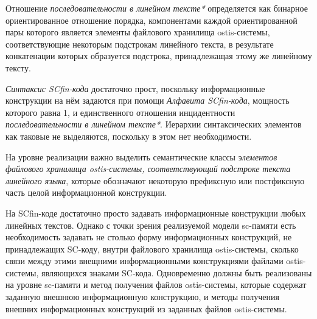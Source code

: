 Отношение \textit{последовательности в линейном тексте*} определяется как бинарное ориентированное отношение порядка, компонентами каждой ориентированной пары которого является элементы файлового хранилища ostis-системы, соответствующие некоторым подстрокам линейного текста, в результате конкатенации которых образуется подстрока, принадлежащая этому же линейному тексту.

\textit{Синтаксис SCfin-кода} достаточно прост, поскольку информационные конструкции на нём задаются при помощи \textit{Алфавита SCfin-кода}, мощность которого равна 1, и единственного отношения инцидентности \textit{последовательности в линейном тексте*}. Иерархии синтаксических элементов как таковые не выделяются, поскольку в этом нет необходимости.

На уровне реализации важно выделить семантические классы э\textit{лементов файлового хранилища ostis-системы, соответствующий подстроке текста линейного языка}, которые обозначают некоторую префиксную или постфиксную часть целой информационной конструкции.

\begin{SCn}
\begin{scnsubstruct}

\begin{scnindent}
    \begin{scneqtoset}
    \end{scneqtoset}
\end{scnindent}

\end{scnsubstruct}
\end{SCn}

На SCfin-коде достаточно просто задавать информационные конструкции любых линейных текстов. Однако с точки зрения реализуемой модели sc-памяти есть необходимость задавать не столько форму информационных конструкций, не принадлежащих SC-коду, внутри файлового хранилища ostis-системы, сколько связи между этими внещними информационными конструкциями файлами ostis-системы, являющихся знаками SC-кода. Одновременно должны быть реализованы на уровне sc-памяти и метод получения файлов ostis-системы, которые содержат заданную внешнюю информационную конструкцию, и методы получения внешних информационных конструкций из заданных файлов ostis-системы.

